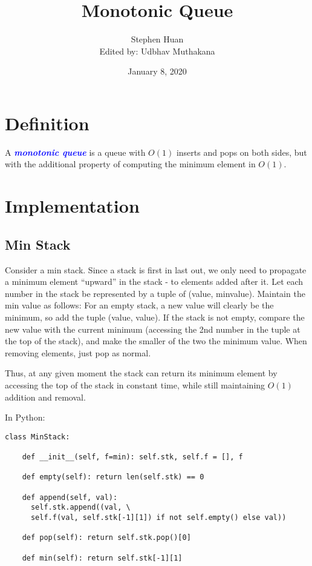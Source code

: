 \documentclass[11pt, oneside]{article}
\title{Monotonic Queue}
\author{Stephen Huan \\ Edited by: Udbhav Muthakana}
\date{January 8, 2020}
\newcommand{\emphasis}[1]{\textcolor{blue}{\textbf{\textit{#1}}}}
\begin{document}
\maketitle

\section{Definition}

A \emphasis{monotonic queue} is a queue with \( O(1) \) inserts and pops on both sides, but with the additional property of computing the minimum element in \( O(1) \).

\section{Implementation}
\subsection{Min Stack}

Consider a min stack. Since a stack is first in last out, we only need to propagate a minimum element
``upward'' in the stack - to elements added after it.
Let each number in the stack be represented by a tuple of (value, minvalue). Maintain the min value as follows:
For an empty stack, a new value will clearly be the minimum, so add the tuple (value, value).
If the stack is not empty, compare the new value with the current minimum (accessing the 2nd number in the tuple at the top of the stack), and make the smaller of the two the minimum value. When removing elements, just pop as normal.

Thus, at any given moment the stack can return its minimum element by accessing the top of the stack in constant time, while still maintaining \( O(1) \) addition and removal.

In Python:

\begin{verbatim}
class MinStack:

    def __init__(self, f=min): self.stk, self.f = [], f

    def empty(self): return len(self.stk) == 0

    def append(self, val):
      self.stk.append((val, \
      self.f(val, self.stk[-1][1]) if not self.empty() else val))

    def pop(self): return self.stk.pop()[0]

    def min(self): return self.stk[-1][1]
\end{verbatim}
\end{document}
